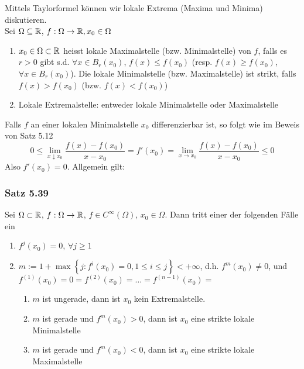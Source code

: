 \noindent Mittels Taylorformel können wir lokale Extrema (Maxima und Minima) diskutieren. \\

\noindent Sei $\Omega\subseteq\mathbb{R}$, $f:\Omega\to\mathbb{R}, x_0\in\Omega$

\begin{definition}{5.38}
\begin{enumerate}
\item $x_0\in\Omega\subset\mathbb{R}$ heisst lokale Maximalstelle (bzw. Minimalstelle) von $f$, falls es $r>0$ gibt s.d. $\forall x\in B_r(x_0)$, $f(x)\leq f(x_0)$ (resp. $f(x)\geq f(x_0)$, $\forall x\in B_r(x_0)$). Die lokale Minimalstelle (bzw. Maximalstelle) ist strikt, falls $f(x)>f(x_0)$ (bzw. $f(x)<f(x_0)$)
\item Lokale Extremalstelle: entweder lokale Minimalstelle oder Maximalstelle
\end{enumerate}
\end{definition}
Falls $f$ an einer lokalen Minimalstelle $x_0$ differenzierbar ist, so folgt wie im Beweis von Satz 5.12 
\[0\leq \lim\limits_{x\downarrow x_0}\frac{f(x)-f(x_0)}{x-x_0}=f'(x_0)=\lim\limits_{x\to x_0}\frac{f(x)-f(x_0)}{x-x_0}\leq 0\]
Also $f'(x_0)=0$. Allgemein gilt:
\subsubsection*{Satz 5.39}
Sei $\Omega\subset\mathbb{R}$, $f:\Omega\to\mathbb{R}$, $f\in C^{\infty}\left( \Omega\right)$, $x_0\in\Omega$. Dann tritt einer der folgenden Fälle ein
\begin{enumerate}
\item $f^j(x_0)=0$, $\forall j\geq 1$
\item $m:=1+\max\left\{ j:f^i(x_0)=0, 1\leq i\leq j \right\} <+\infty $, d.h. $f^m(x_0)\not=0$, und $f^{(1)}(x_0)=0=f^{(2)}(x_0)=\dots=f^{(n-1)}(x_0)=$
\begin{enumerate}
\item[\hspace{4mm}(2.1)] $m$ ist ungerade, dann ist $x_0$ kein Extremalstelle.
\item[\hspace{4mm}(2.2)] $m$ ist gerade und $f^m(x_0)>0$, dann ist $x_0$ eine strikte lokale Minimalstelle
\item[\hspace{4mm}(2.3)] $m$ ist gerade und $f^m(x_0)<0$, dann ist $x_0$ eine strikte lokale Maximalstelle
\end{enumerate}
\end{enumerate}

